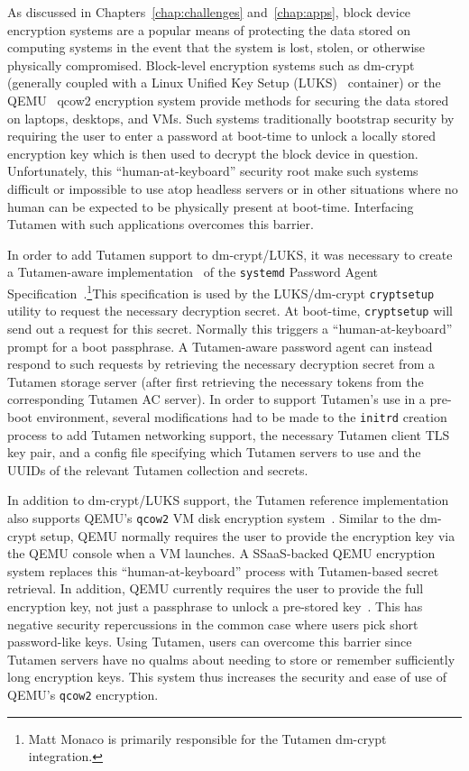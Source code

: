 As discussed in Chapters~\ref{chap:challenges} and~\ref{chap:apps},
block device encryption systems are a popular means of protecting the
data stored on computing systems in the event that the system is lost,
stolen, or otherwise physically compromised.  Block-level encryption
systems such as dm-crypt~\cite{dm-crypt} (generally coupled with a
Linux Unified Key Setup (LUKS)~\cite{luks} container) or the
QEMU~\cite{qemu} qcow2 encryption system provide methods for securing
the data stored on laptops, desktops, and VMs. Such systems
traditionally bootstrap security by requiring the user to enter a
password at boot-time to unlock a locally stored encryption key which
is then used to decrypt the block device in question. Unfortunately,
this ``human-at-keyboard'' security root make such systems difficult
or impossible to use atop headless servers or in other situations
where no human can be expected to be physically present at
boot-time. Interfacing Tutamen with such applications overcomes this
barrier.

In order to add Tutamen support to dm-crypt/LUKS, it was necessary to
create a Tutamen-aware implementation~\cite{src-tutamen-askpassword}
of the \texttt{systemd} Password Agent
Specification~\cite{systemd-passwordagents}.\footnote{Matt Monaco is
  primarily responsible for the Tutamen dm-crypt integration.}This
specification is used by the LUKS/dm-crypt \texttt{cryptsetup} utility
to request the necessary decryption secret. At boot-time,
\texttt{cryptsetup} will send out a request for this secret. Normally
this triggers a ``human-at-keyboard'' prompt for a boot passphrase. A
Tutamen-aware password agent can instead respond to such requests by
retrieving the necessary decryption secret from a Tutamen storage
server (after first retrieving the necessary tokens from the
corresponding Tutamen AC server). In order to support Tutamen's use in
a pre-boot environment, several modifications had to be made to the
\texttt{initrd} creation process to add Tutamen networking support,
the necessary Tutamen client TLS key pair, and a config file
specifying which Tutamen servers to use and the UUIDs of the relevant
Tutamen collection and secrets.

In addition to dm-crypt/LUKS support, the Tutamen reference
implementation also supports QEMU's \texttt{qcow2} VM disk encryption
system~\cite{src-qemu-tutamen}. Similar to the dm-crypt setup, QEMU
normally requires the user to provide the encryption key via the QEMU
console when a VM launches. A SSaaS-backed QEMU encryption system
replaces this ``human-at-keyboard'' process with Tutamen-based secret
retrieval. In addition, QEMU currently requires the user to provide
the full encryption key, not just a passphrase to unlock a pre-stored
key~\cite{berrange-qemucrypto}. This has negative security
repercussions in the common case where users pick short password-like
keys. Using Tutamen, users can overcome this barrier since Tutamen
servers have no qualms about needing to store or remember sufficiently
long encryption keys. This system thus increases the security and ease
of use of QEMU's \texttt{qcow2} encryption.

